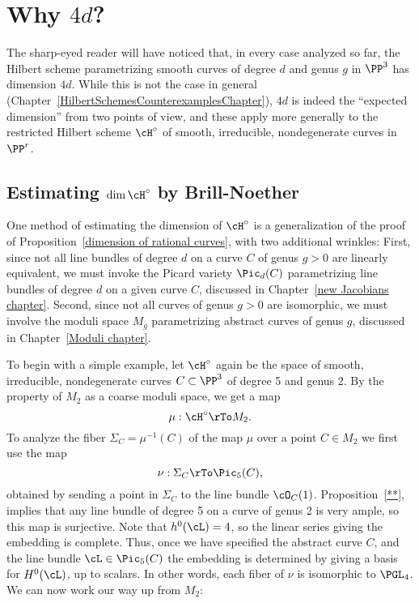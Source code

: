 \section{Why  $4d$?}\label{estimating dim hilb}

The sharp-eyed reader will have noticed that, in every case analyzed so far,  the Hilbert scheme parametrizing smooth curves of degree $d$ and genus $g$ in $\PP^3$ has dimension $4d$. While this is not the case in general (Chapter~\ref{HilbertSchemesCounterexamplesChapter}), $4d$ is indeed the ``expected dimension'' from two points of view,
and these apply more generally to the restricted Hilbert scheme $\cH^\circ$ of smooth, irreducible, nondegenerate curves in $\PP^r$.

\subsection{Estimating $\dim \cH^\circ$ by Brill-Noether}

One method of estimating  the dimension of $\cH^\circ$ is a generalization of the proof of Proposition~\ref{dimension of rational curves}, with two additional wrinkles: First, since not all line bundles of degree $d$ on a curve $C$ of genus $g > 0$ are linearly equivalent, we must invoke the Picard variety $\Pic_d(C)$ parametrizing line bundles of degree $d$ on a given curve $C$, discussed in Chapter~\ref{new Jacobians chapter}. Second, since not all curves of genus $g > 0$ are isomorphic, we must involve the moduli space  $M_g$ parametrizing abstract curves of genus $g$, discussed in Chapter~\ref{Moduli chapter}.

To begin with a simple example, let $\cH^\circ$ again be the space of smooth, irreducible, nondegenerate curves $C \subset \PP^3$ of degree 5 and genus 2. By the property of $M_{2}$ as a coarse moduli space, we get a map
$$
\mu : \cH^\circ \rTo M_2.
$$
To analyze the fiber $\Sigma_C =\mu^{-1}(C)$ of the map $\mu$ over a point $C \in M_2$ we first use the map
$$
\nu : \Sigma_C \rTo \Pic_5(C),
$$
obtained by sending a point in $\Sigma_C$ to the line bundle $\cO_C(1)$. Proposition~\ref{**}, implies that any line bundle of degree 5 on a curve of genus 2 is very ample, so this map is surjective. Note that 
$h^0(\cL) = 4$, so the linear series  giving the embedding is complete. Thus, once we have specified the abstract curve $C$, and the line bundle $\cL \in \Pic_5(C)$ the embedding is determined by giving a basis for $H^0(\cL)$, up to scalars. In other words, each fiber of $\nu$ is isomorphic to $\PGL_4$. We can now work our way up from $M_2$:

